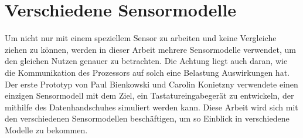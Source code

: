 \section{Verschiedene Sensormodelle}
Um nicht nur mit einem speziellem Sensor zu arbeiten und keine Vergleiche ziehen zu können, werden in dieser Arbeit mehrere Sensormodelle verwendet, um den gleichen Nutzen genauer zu betrachten. Die Achtung liegt auch daran, wie die Kommunikation des Prozessors auf solch eine Belastung Auswirkungen hat. Der erste Prototyp von Paul Bienkowski und Carolin Konietzny verwendete einen einzigen Sensormodell mit dem Ziel, ein Tastatureingabegerät zu entwickeln, der mithilfe des Datenhandschuhes simuliert werden kann.
Diese Arbeit wird sich mit den verschiedenen Sensormodellen beschäftigen, um so Einblick in verschiedene Modelle zu bekommen.